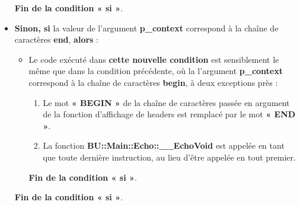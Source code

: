 \documentclass[a4paper,10pt]{article}
\begin{document}
\begin{itemize}
{\begin{itemize}
{                \begin{justify}
                    \textbf{\color{cond}Fin de la condition « si »}.
                \end{justify}
            }
        \end{itemize}
    }

    \item
    {
        \setlength{\parskip}{2em}

        \begin{justify}
            \textbf{\color{cond}Sinon, si} la valeur de l'argument \textbf{\color{vars}p\_context} correspond à la chaîne de caractères \textbf{end}, \textbf{\color{cond}alors} :
        \end{justify}

        \setlength{\parskip}{1em}

        \begin{itemize}
            \item
            {
                \begin{justify}
                    Le code exécuté dans \textbf{\color{cond}cette nouvelle condition} est sensiblement le même que dans la condition précédente, où la l'argument \textbf{\color{vars}p\_context} correspond à la chaîne de caractères \textbf{begin}, à deux exceptions près :

                    \begin{enumerate}
                        \item Le mot \textbf{« BEGIN »} de la chaîne de caractères passée en argument de la fonction d'affichage de headers est remplacé par le mot \textbf{« END »}.

                        \item La fonction \textbf{\color{func}BU::Main::Echo::\_\_EchoVoid} est appelée en tant que toute dernière instruction, au lieu d'être appelée en tout premier.
                    \end{enumerate}
                \end{justify}\setlength{\parskip}{1em}

                \begin{justify}
                    \textbf{\color{cond}Fin de la condition « si »}.
                \end{justify}
            }
        \end{itemize}

        \begin{justify}
            \textbf{\color{cond}Fin de la condition « si »}.
        \end{justify}
    }
\end{itemize}
\end{document}
